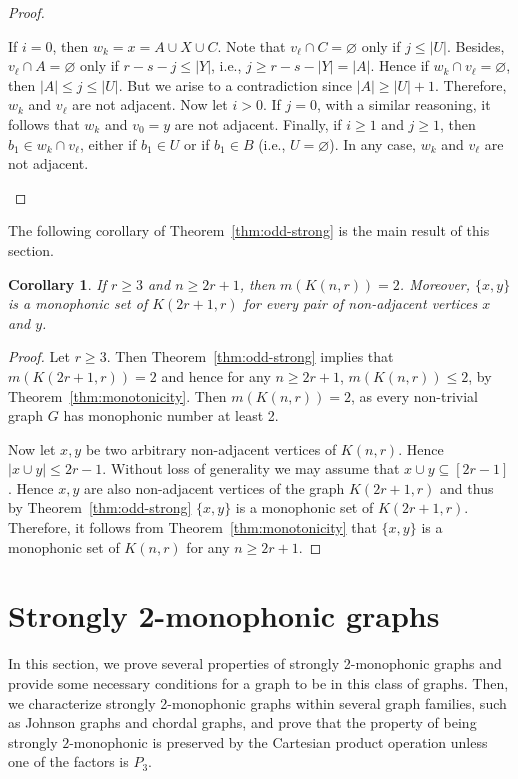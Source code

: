 \documentclass[a4paper,11pt]{article}
\newtheorem{corollary}[theorem]{Corollary}
\renewcommand{\emptyset}{\varnothing}
\begin{document}
\begin{proof}
\begin{description}
\begin{itemize}
                If $i=0$, then $w_k=x=A\cup X\cup C$. Note that $v_\ell\cap C=\emptyset$ only if $j\leq |U|$. Besides, $v_\ell\cap A=\emptyset$ only if $r-s-j\leq |Y|$, i.e., $j\geq r-s-|Y|=|A|$. Hence if $w_k\cap v_\ell=\emptyset$, then $|A|\leq j\leq |U|$. But we arise to a contradiction since $|A|\geq |U|+1$. Therefore, $w_k$ and $v_\ell$ are not adjacent. 
                Now let $i > 0$. If $j=0$, with a similar reasoning, it follows that $w_k$ and $v_0=y$ are not adjacent. Finally, if $i\geq 1$ and $j\geq 1$, then $b_1\in w_k\cap v_\ell$, either if $b_1\in U$ or if $b_1\in B$ (i.e., $U=\emptyset$). In any case, $w_k$ and $v_\ell$ are not adjacent.
        \end{itemize}
         \end{description}
\end{proof}

The following corollary of Theorem~\ref{thm:odd-strong} is the main result of this section.

\begin{corollary}\label{cor:monophonic=2}
    If $r \geq 3$ and $n \geq 2r+1$, then $m(K(n,r))=2$. Moreover, $\{x,y\}$ is a monophonic set of $K(2r+1,r)$ for every pair of non-adjacent vertices $x$ and $y$.
\end{corollary}
\begin{proof}
    Let $r\geq 3$. Then Theorem~\ref{thm:odd-strong} implies that $m(K(2r+1,r))=2$ and hence for any $n\geq 2r+1$, $m(K(n,r)) \leq 2$, by Theorem~\ref{thm:monotonicity}. Then $m(K(n,r))=2$, as every non-trivial graph $G$ has monophonic number at least 2. 

    Now let $x,y$ be two arbitrary non-adjacent vertices of $K(n,r)$. Hence $|x \cup y| \leq 2r-1$. Without loss of generality we may assume that $x \cup y \subseteq [2r-1]$. Hence $x,y$ are also non-adjacent vertices of the graph $K(2r+1,r)$ and thus by Theorem~\ref{thm:odd-strong} $\{x,y\}$ is a monophonic set of $K(2r+1,r)$. Therefore, it follows from Theorem~\ref{thm:monotonicity} that $\{x,y\}$ is a monophonic set of $K(n,r)$ for any $n\geq 2r+1$. 
\end{proof}



\section{Strongly 2-monophonic graphs}\label{s:strongly} 

In this section, we prove several properties of strongly 2-monophonic graphs and provide some necessary conditions for a graph to be in this class of graphs. Then, we characterize strongly 2-monophonic graphs within several graph families, such as  Johnson graphs and chordal graphs, and prove that the property of being strongly $2$-monophonic is preserved by the Cartesian product operation unless one of the factors is $P_3$. 
\end{document}
